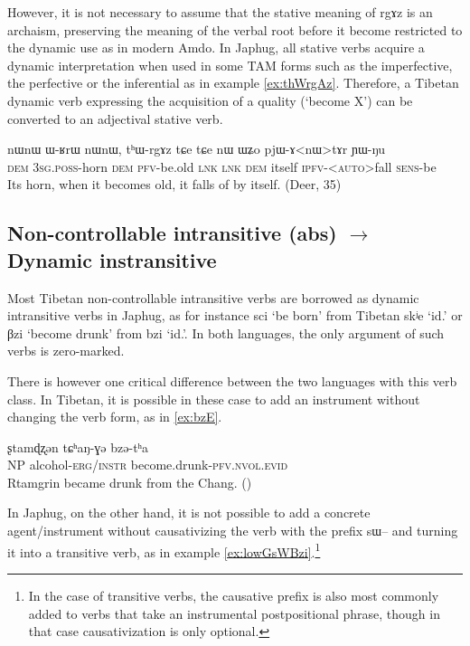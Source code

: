 \documentclass[oldfontcommands,oneside,a4paper,11pt]{article}
\newcommand{\ipa}[1]{{\phon \mbox{#1}}} %
\begin{document}
However, it is not necessary to assume that the stative meaning of \ipa{rgɤz} is an archaism, preserving the meaning of the verbal root before it become restricted to the dynamic use as in modern Amdo. In Japhug, all stative verbs acquire a dynamic interpretation when used in some TAM forms such as the imperfective, the perfective or the inferential as in example \ref{ex:thWrgAz}. Therefore, a Tibetan dynamic verb expressing the acquisition of a quality (`become X') can be converted to an adjectival stative verb.

\begin{exe}
\ex \label{ex:thWrgAz}
\gll
\ipa{nɯnɯ}  	\ipa{ɯ-ʁrɯ}  	\ipa{nɯnɯ,}  	\ipa{tʰɯ-rgɤz}  	\ipa{tɕe}  	\ipa{tɕe}  	\ipa{nɯ}  	\ipa{ɯʑo}  	\ipa{pjɯ-ɤ<nɯ>tɤr}  	\ipa{ɲɯ-ŋu}  \\
\textsc{dem} \textsc{3sg.poss}-horn \textsc{dem} \textsc{pfv}-be.old \textsc{lnk}  \textsc{lnk} \textsc{dem} itself \textsc{ipfv}-<\textsc{auto}>fall \textsc{sens}-be \\
\glt Its horn, when it becomes old, it falls of by itself. (Deer, 35)
\end{exe}


\subsection{Non-controllable intransitive (abs) $\rightarrow$ Dynamic instransitive}  
Most Tibetan non-controllable intransitive verbs are borrowed as dynamic intransitive verbs in Japhug, as for instance \ipa{sci} `be born' from Tibetan \ipa{skʲe} `id.' or \ipa{βzi} `become drunk' from \ipa{bzi} `id.'. In both languages, the only argument of such verbs is zero-marked.

There is however one critical difference between the two languages with this verb class. In Tibetan, it is possible in these case to add an instrument without changing the verb form, as in \ref{ex:bzE}.

\begin{exe}
\ex \label{ex:bzE}
\gll
\ipa{ʂtamɖʐən} 	\ipa{tɕʰaŋ-ɣə} \ipa{bzə-tʰa} 	 \\
NP alcohol-\textsc{erg/instr} become.drunk-\textsc{pfv.nvol.evid} \\
\glt Rtamgrin became drunk from the Chang. (\citealt[112:443]{haller04themchen})
\end{exe}

In Japhug, on the other hand, it is not possible to add a concrete agent/instrument without causativizing the verb with the prefix \ipa{sɯ--} and turning it into a transitive verb, as in example \ref{ex:lowGsWBzi}.\footnote{In the case of transitive verbs, the causative prefix is also most commonly added to verbs that take an instrumental postpositional phrase, though in that case causativization is only optional.}
\end{document}
